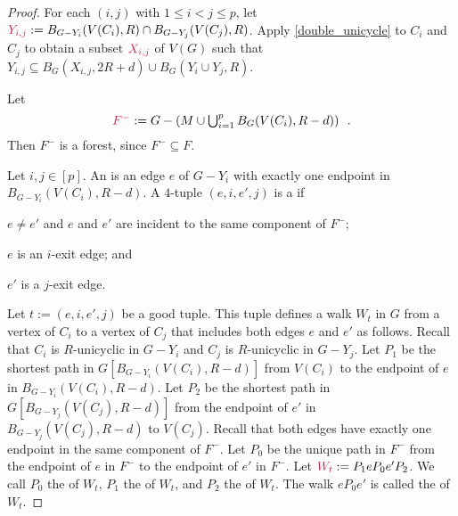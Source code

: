 \documentclass{patmorin}
\newcommand{\pat}[1]{\textcolor{Blue}{Pat: #1}}
\begin{document}
\begin{proof}
For each $(i,j)$ with $1\le i < j \le p$, let $\mathdefin{Y_{i,j}}:=B_{G-Y_i}(V(C_i),R)\cap B_{G-Y_j}(V(C_j),R)$.  Apply \cref{double_unicycle} to $C_i$ and $C_j$ to obtain a subset $\mathdefin{X_{i,j}}$ of $V(G)$ such that $Y_{i,j}\subseteq B_G(X_{i,j},2R+d) \cup B_G(Y_i\cup Y_j,R)$.

Let
\[
  \textstyle\mathdefin{F^-}:=G-\left(M\cup \bigcup_{i=1}^p B_G(V(C_i),R-d)\right) \enspace .
\]
Then $F^-$ is a forest, since $F^-\subseteq F$.

Let $i,j\in[p]$. An  is an edge $e$ of $G-Y_i$ with exactly one endpoint in $B_{G-Y_i}(V(C_i),R-d)$.
A $4$-tuple $(e,i,e',j)$ is a  if
\begin{compactitem}
  \item $e\neq e'$ and $e$ and $e'$ are incident to the same component of $F^-$;
  \item $e$ is an $i$-exit edge;
  and \item $e'$ is a $j$-exit edge.
\end{compactitem}


Let $t:=(e,i,e',j)$ be a good tuple.
This tuple defines a walk $W_t$ in $G$ from a vertex of $C_i$ to a vertex of $C_j$ that includes both edges $e$ and $e'$ as follows. %
Recall that $C_i$ is $R$-unicyclic in $G-Y_i$ and
$C_j$ is $R$-unicyclic in $G-Y_j$.
Let $P_1$ be the shortest path in $G[B_{G-Y_i}(V(C_i),R-d)]$ from $V(C_i)$ to the endpoint of $e$ in $B_{G-Y_i}(V(C_i),R-d)$.
Let $P_2$ be the shortest path in $G[B_{G-Y_j}(V(C_j),R-d)]$ from the endpoint of $e'$ in $B_{G-Y_j}(V(C_j),R-d)$ to $V(C_j)$.
Recall that both edges have exactly one endpoint in the same component of $F^-$.
Let $P_0$ be the unique path in $F^-$
from the endpoint of $e$ in $F^-$ to the endpoint of $e'$ in $F^-$.
Let $\mathdefin{W_t}:=P_1eP_0e'P_2$.
We call $P_0$ the  of $W_t$, $P_1$ the  of $W_t$, and $P_2$ the  of $W_t$.  The walk $eP_0e'$ is called the  of $W_t$.



\end{proof}
\end{document}
